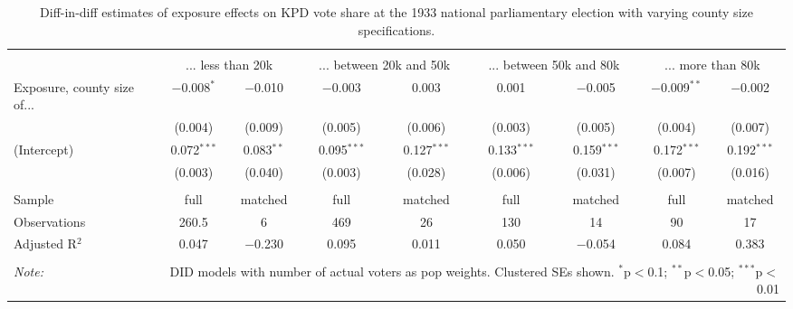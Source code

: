 
\begin{table}[!htbp] \centering 
  \caption{Diff-in-diff estimates of exposure effects on KPD vote share at the 1933 national parliamentary election with varying county size specifications.\vspace{-.25cm}} 
  \label{tab:nsdap-voteshare-kpd-countysize-dd-1933} 
\scriptsize 
\begin{tabular}{@{\extracolsep{5pt}}lcccccccc} 
\\[-1.8ex]\hline 
\hline \\[-1.8ex] 
 & \multicolumn{2}{c}{... less than 20k } & \multicolumn{2}{c}{... between 20k and 50k} & \multicolumn{2}{c}{... between 50k and 80k} & \multicolumn{2}{c}{... more than 80k} \\ 
 \cmidrule(r){2-3}\cmidrule(r){4-5}\cmidrule(r){6-7}\cmidrule(r){8-9}Exposure, county size of... & $-$0.008$^{*}$ & $-$0.010 & $-$0.003 & 0.003 & 0.001 & $-$0.005 & $-$0.009$^{**}$ & $-$0.002 \\ 
  & (0.004) & (0.009) & (0.005) & (0.006) & (0.003) & (0.005) & (0.004) & (0.007) \\ 
  (Intercept) & 0.072$^{***}$ & 0.083$^{**}$ & 0.095$^{***}$ & 0.127$^{***}$ & 0.133$^{***}$ & 0.159$^{***}$ & 0.172$^{***}$ & 0.192$^{***}$ \\ 
  & (0.003) & (0.040) & (0.003) & (0.028) & (0.006) & (0.031) & (0.007) & (0.016) \\ 
 \hline \\[-1.8ex] 
Sample & full & matched & full & matched & full & matched & full & matched \\ 
Observations & 260.5 & 6 & 469 & 26 & 130 & 14 & 90 & 17 \\ 
Adjusted R$^{2}$ & 0.047 & $-$0.230 & 0.095 & 0.011 & 0.050 & $-$0.054 & 0.084 & 0.383 \\ 
\hline 
\hline \\[-1.8ex] 
\textit{Note:}  & \multicolumn{8}{r}{DID models with number of actual voters as pop weights. Clustered SEs shown. $^{*}$p$<$0.1; $^{**}$p$<$0.05; $^{***}$p$<$0.01} \\ 
\end{tabular} 
\end{table} 
